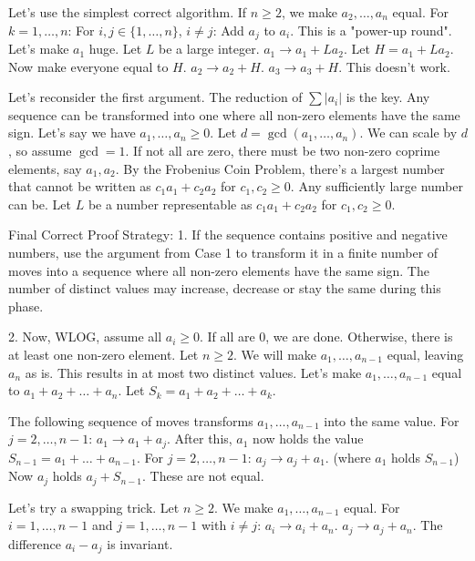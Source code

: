 Let's use the simplest correct algorithm.
If $n \ge 2$, we make $a_2, \ldots, a_n$ equal.
For $k=1, \dots, n$:
  For $i, j \in \{1, \dots, n\}$, $i \ne j$:
     Add $a_j$ to $a_i$. This is a "power-up round".
Let's make $a_1$ huge. Let $L$ be a large integer.
$a_1 \to a_1 + L a_2$. Let $H = a_1+La_2$.
Now make everyone equal to $H$.
$a_2 \to a_2+H$. $a_3 \to a_3+H$. This doesn't work.

Let's reconsider the first argument. The reduction of $\sum |a_i|$ is the key.
Any sequence can be transformed into one where all non-zero elements have the same sign.
Let's say we have $a_1, \dots, a_n \ge 0$. Let $d=\gcd(a_1, \dots, a_n)$. We can scale by $d$, so assume $\gcd=1$. If not all are zero, there must be two non-zero coprime elements, say $a_1, a_2$. By the Frobenius Coin Problem, there's a largest number that cannot be written as $c_1 a_1 + c_2 a_2$ for $c_1, c_2 \ge 0$. Any sufficiently large number can be.
Let $L$ be a number representable as $c_1 a_1 + c_2 a_2$ for $c_1, c_2 \ge 0$.

Final Correct Proof Strategy:
1.  If the sequence contains positive and negative numbers, use the argument from Case 1 to transform it in a finite number of moves into a sequence where all non-zero elements have the same sign. The number of distinct values may increase, decrease or stay the same during this phase.

2.  Now, WLOG, assume all $a_i \ge 0$. If all are 0, we are done. Otherwise, there is at least one non-zero element. Let $n \geq 2$. We will make $a_1, \dots, a_{n-1}$ equal, leaving $a_n$ as is. This results in at most two distinct values.
    Let's make $a_1, \dots, a_{n-1}$ equal to $a_1+a_2+\dots+a_n$.
    Let $S_k = a_1+a_2+\dots+a_k$.

    The following sequence of moves transforms $a_1, \dots, a_{n-1}$ into the same value.
    For $j=2, \dots, n-1$:
        $a_1 \to a_1+a_j$.
    After this, $a_1$ now holds the value $S_{n-1} = a_1+\dots+a_{n-1}$.
    For $j=2, \dots, n-1$:
        $a_j \to a_j+a_1$. (where $a_1$ holds $S_{n-1}$)
    Now $a_j$ holds $a_j+S_{n-1}$. These are not equal.

Let's try a swapping trick. Let $n \ge 2$. We make $a_1, \dots, a_{n-1}$ equal.
For $i=1, \dots, n-1$ and $j=1, \dots, n-1$ with $i \ne j$:
    $a_i \to a_i+a_n$.
    $a_j \to a_j+a_n$.
The difference $a_i-a_j$ is invariant.

